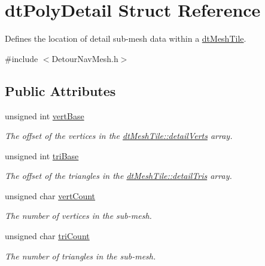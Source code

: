 \hypertarget{structdtPolyDetail}{}\section{dt\+Poly\+Detail Struct Reference}
\label{structdtPolyDetail}


Defines the location of detail sub-\/mesh data within a \hyperlink{structdtMeshTile}{dt\+Mesh\+Tile}.  




{\ttfamily \#include $<$Detour\+Nav\+Mesh.\+h$>$}

\subsection*{Public Attributes}
\begin{DoxyCompactItemize}
\item 
\mbox{\label{structdtPolyDetail_ae3f408c9c8974ccd058a98f781c58801}} 
unsigned int \hyperlink{structdtPolyDetail_ae3f408c9c8974ccd058a98f781c58801}{vert\+Base}
\begin{DoxyCompactList}\small\item\em The offset of the vertices in the \hyperlink{structdtMeshTile_a916cb93915400b3a0edabe9c2206c670}{dt\+Mesh\+Tile\+::detail\+Verts} array. \end{DoxyCompactList}\item 
\mbox{\label{structdtPolyDetail_aaccd8de89ab39454558ce4bfe6230c98}} 
unsigned int \hyperlink{structdtPolyDetail_aaccd8de89ab39454558ce4bfe6230c98}{tri\+Base}
\begin{DoxyCompactList}\small\item\em The offset of the triangles in the \hyperlink{structdtMeshTile_ad32d72c505505031c56f3d3507dede17}{dt\+Mesh\+Tile\+::detail\+Tris} array. \end{DoxyCompactList}\item 
\mbox{\label{structdtPolyDetail_a2b1473cb6f856126db05a2955fbb2a61}} 
unsigned char \hyperlink{structdtPolyDetail_a2b1473cb6f856126db05a2955fbb2a61}{vert\+Count}
\begin{DoxyCompactList}\small\item\em The number of vertices in the sub-\/mesh. \end{DoxyCompactList}\item 
\mbox{\label{structdtPolyDetail_aef53174e1c31d4304bc07da5d677528c}} 
unsigned char \hyperlink{structdtPolyDetail_aef53174e1c31d4304bc07da5d677528c}{tri\+Count}
\begin{DoxyCompactList}\small\item\em The number of triangles in the sub-\/mesh. \end{DoxyCompactList}\end{DoxyCompactItemize}


